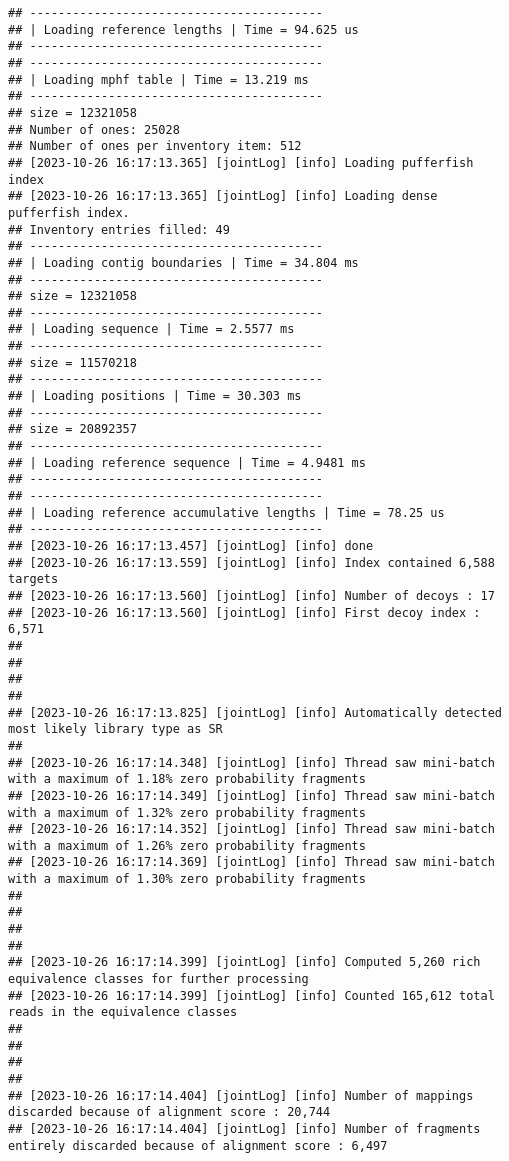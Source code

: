 \documentclass[
]{book}
\begin{document}
\begin{verbatim}
## -----------------------------------------
## | Loading reference lengths | Time = 94.625 us
## -----------------------------------------
## -----------------------------------------
## | Loading mphf table | Time = 13.219 ms
## -----------------------------------------
## size = 12321058
## Number of ones: 25028
## Number of ones per inventory item: 512
## [2023-10-26 16:17:13.365] [jointLog] [info] Loading pufferfish index
## [2023-10-26 16:17:13.365] [jointLog] [info] Loading dense pufferfish index.
## Inventory entries filled: 49
## -----------------------------------------
## | Loading contig boundaries | Time = 34.804 ms
## -----------------------------------------
## size = 12321058
## -----------------------------------------
## | Loading sequence | Time = 2.5577 ms
## -----------------------------------------
## size = 11570218
## -----------------------------------------
## | Loading positions | Time = 30.303 ms
## -----------------------------------------
## size = 20892357
## -----------------------------------------
## | Loading reference sequence | Time = 4.9481 ms
## -----------------------------------------
## -----------------------------------------
## | Loading reference accumulative lengths | Time = 78.25 us
## -----------------------------------------
## [2023-10-26 16:17:13.457] [jointLog] [info] done
## [2023-10-26 16:17:13.559] [jointLog] [info] Index contained 6,588 targets
## [2023-10-26 16:17:13.560] [jointLog] [info] Number of decoys : 17
## [2023-10-26 16:17:13.560] [jointLog] [info] First decoy index : 6,571 
## 
## 
## 
## 
## [2023-10-26 16:17:13.825] [jointLog] [info] Automatically detected most likely library type as SR
## 
## [2023-10-26 16:17:14.348] [jointLog] [info] Thread saw mini-batch with a maximum of 1.18% zero probability fragments
## [2023-10-26 16:17:14.349] [jointLog] [info] Thread saw mini-batch with a maximum of 1.32% zero probability fragments
## [2023-10-26 16:17:14.352] [jointLog] [info] Thread saw mini-batch with a maximum of 1.26% zero probability fragments
## [2023-10-26 16:17:14.369] [jointLog] [info] Thread saw mini-batch with a maximum of 1.30% zero probability fragments
## 
## 
## 
## 
## [2023-10-26 16:17:14.399] [jointLog] [info] Computed 5,260 rich equivalence classes for further processing
## [2023-10-26 16:17:14.399] [jointLog] [info] Counted 165,612 total reads in the equivalence classes 
## 
## 
## 
## 
## [2023-10-26 16:17:14.404] [jointLog] [info] Number of mappings discarded because of alignment score : 20,744
## [2023-10-26 16:17:14.404] [jointLog] [info] Number of fragments entirely discarded because of alignment score : 6,497

\end{verbatim}
\end{document}
